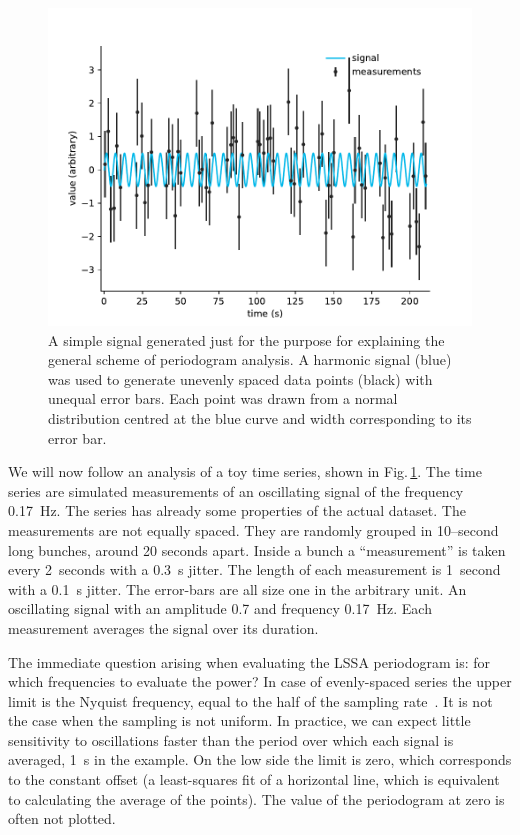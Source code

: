 \begin{figure}
  \centering \includegraphics[width=0.8\linewidth]{gfx/axions/basic_signal.pdf}
  \caption{A simple signal generated just for the purpose for explaining the general scheme of periodogram analysis. A harmonic signal (blue) was used to generate unevenly spaced data points (black) with unequal error bars. Each point was drawn from a normal distribution centred at the blue curve and width corresponding to its error bar.}\label{fig:basic_signal}
\end{figure}

We will now follow an analysis of a toy time series, shown in Fig.\,\ref{fig:basic_signal}. The time series are simulated measurements of an oscillating signal of the frequency \SI{0.17}{\hertz}. The series has already some properties of the actual dataset. The measurements are not equally spaced. They are randomly grouped in 10--second long bunches, around 20 seconds apart. Inside a bunch a ``measurement'' is taken every 2~seconds with a \SI{0.3}{\second} jitter. The length of each measurement is 1~second with a \SI{0.1}{\second} jitter. The error-bars are all size one in the arbitrary unit. An oscillating signal with an amplitude 0.7 and frequency \SI{0.17}{\hertz}. Each measurement averages the signal over its duration.

The immediate question arising when evaluating the LSSA periodogram is: for which frequencies to evaluate the power? In case of evenly-spaced series the upper limit is the Nyquist frequency, equal to the half of the sampling rate~\cite{Shannon1949}. It is not the case when the sampling is not uniform. In practice, we can expect little sensitivity to oscillations faster than the period over which each signal is averaged, \SI{1}{\second} in the example. On the low side the limit is zero, which corresponds to the constant offset (a least-squares fit of a horizontal line, which is equivalent to calculating the average of the points). The value of the periodogram at zero is often not plotted.

